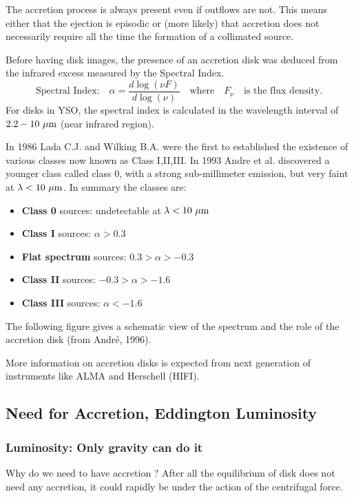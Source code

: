 \documentclass[10pt,a4paper,english]{article}
\begin{document}
The accretion process is always present even if outflows are not. This means
either that the ejection is episodic or (more likely) that accretion does not
necessarily require all the time the formation of a collimated source.

Before having disk images, the presence of an accretion disk was deduced from
the infrared excess measured by the Spectral Index. \[\text{Spectral
Index:}\quad \alpha=\frac{d\log(\nu F)}{d \log(\nu)}\quad\text{where}\quad
F_{\nu}\quad\text{is the flux density.}\] For disks in YSO, the spectral index
is calculated in the wavelength interval of $2.2-10 \ \mathrm{\mu m}$ (near infrared
region).

In 1986 Lada C.J. and Wilking B.A. were the first to established the existence
of various classes now known as Class I,II,III. In 1993 Andre et al. discovered
a younger class called class 0, with a strong sub-millimeter emission, but very
faint at $\lambda<10\ \mathrm{\mu m}$. In summary the classes are:
\begin{itemize}
    \item \textbf{Class 0} sources: undetectable at $\lambda<10\ \mathrm{\mu m}$
    \item \textbf{Class I} sources: $\alpha>0.3$
    \item \textbf{Flat spectrum} sources: $0.3>\alpha>-0.3$
    \item \textbf{Class II} sources: $-0.3>\alpha>-1.6$
    \item \textbf{Class III} sources: $\alpha<-1.6$
\end{itemize}

The following figure gives a schematic view of the spectrum and the role of the
accretion disk (from André, 1996).

More information on accretion disks is expected from next generation of
instruments like ALMA and Herschell (HIFI).

\subsection{Need for Accretion, Eddington Luminosity}

\subsubsection{Luminosity: Only gravity can do it}

Why do we need to have accretion ? After all the equilibrium of disk does not
need any accretion, it could rapidly be under the action of the centrifugal
force.
\end{document}
